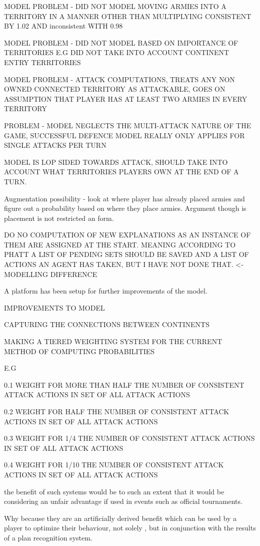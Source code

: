 \documentclass[parskip]{cs4rep}
\begin{document}
MODEL PROBLEM - DID NOT MODEL MOVING ARMIES INTO A TERRITORY IN A MANNER OTHER THAN MULTIPLYING CONSISTENT BY 1.02 AND inconsistent WITH 0.98

MODEL PROBLEM - DID NOT MODEL BASED ON IMPORTANCE OF TERRITORIES E.G DID NOT TAKE INTO ACCOUNT CONTINENT ENTRY TERRITORIES

MODEL PROBLEM - ATTACK COMPUTATIONS, TREATS ANY NON OWNED CONNECTED TERRITORY AS ATTACKABLE, GOES ON ASSUMPTION THAT PLAYER HAS AT LEAST TWO ARMIES IN EVERY TERRITORY

PROBLEM - MODEL NEGLECTS THE MULTI-ATTACK NATURE OF THE GAME, SUCCESSFUL DEFENCE MODEL REALLY ONLY APPLIES FOR SINGLE ATTACKS PER TURN

MODEL IS LOP SIDED TOWARDS ATTACK, SHOULD TAKE INTO ACCOUNT WHAT TERRITORIES PLAYERS OWN AT THE END OF A TURN.

Augmentation possibility - look at where player has already placed armies and figure out a probability based on where they place armies. Argument though is placement is not restricted an form.

DO NO COMPUTATION OF NEW EXPLANATIONS AS AN INSTANCE OF THEM ARE ASSIGNED AT THE START. MEANING ACCORDING TO PHATT A LIST OF PENDING SETS SHOULD BE SAVED AND A LIST OF ACTIONS AN AGENT HAS TAKEN, BUT I HAVE NOT DONE THAT. <- MODELLING DIFFERENCE

A platform has been setup for further improvements of the model.

IMPROVEMENTS TO MODEL

CAPTURING THE CONNECTIONS BETWEEN CONTINENTS

MAKING A TIERED WEIGHTING SYSTEM FOR THE CURRENT METHOD OF COMPUTING PROBABILITIES

E.G 

0.1 WEIGHT FOR MORE THAN HALF THE NUMBER OF CONSISTENT ATTACK ACTIONS IN SET OF ALL ATTACK ACTIONS

0.2 WEIGHT FOR HALF THE NUMBER OF CONSISTENT ATTACK ACTIONS IN SET OF ALL ATTACK ACTIONS

0.3 WEIGHT FOR 1/4 THE NUMBER OF CONSISTENT ATTACK ACTIONS IN SET OF ALL ATTACK ACTIONS

0.4 WEIGHT FOR 1/10 THE NUMBER OF CONSISTENT ATTACK ACTIONS IN SET OF ALL ATTACK ACTIONS

the benefit of such systems would be to such an extent that it would be considering an unfair advantage if used in events such as official tournaments.

Why because they are an artificially derived benefit which can be used by a player to optimize their behaviour, not solely , but in conjunction with the results of a plan recognition system.
\end{document}

